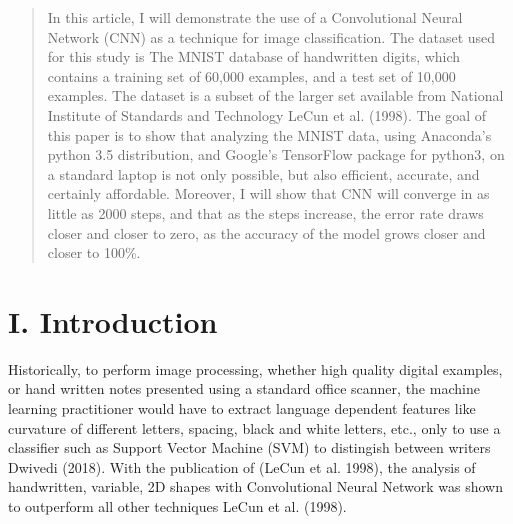 \documentclass[conference,final,]{IEEEtran}
\begin{document}
\begin{abstract}
In this article, I will demonstrate the use of a Convolutional Neural
Network (CNN) as a technique for image classification. The dataset used
for this study is The MNIST database of handwritten digits, which
contains a training set of 60,000 examples, and a test set of 10,000
examples. The dataset is a subset of the larger set available from
National Institute of Standards and Technology LeCun et al. (1998). The
goal of this paper is to show that analyzing the MNIST data, using
Anaconda's python 3.5 distribution, and Google's TensorFlow package for
python3, on a standard laptop is not only possible, but also efficient,
accurate, and certainly affordable. Moreover, I will show that CNN will
converge in as little as 2000 steps, and that as the steps increase, the
error rate draws closer and closer to zero, as the accuracy of the model
grows closer and closer to 100\%.
\end{abstract}





\maketitle


%
\IEEEpeerreviewmaketitle


\section{I. Introduction}\label{i.-introduction}

Historically, to perform image processing, whether high quality digital
examples, or hand written notes presented using a standard office
scanner, the machine learning practitioner would have to extract
language dependent features like curvature of different letters,
spacing, black and white letters, etc., only to use a classifier such as
Support Vector Machine (SVM) to distingish between writers Dwivedi
(2018). With the publication of (LeCun et al. 1998), the analysis of
handwritten, variable, 2D shapes with Convolutional Neural Network was
shown to outperform all other techniques LeCun et al. (1998).
\end{document}

